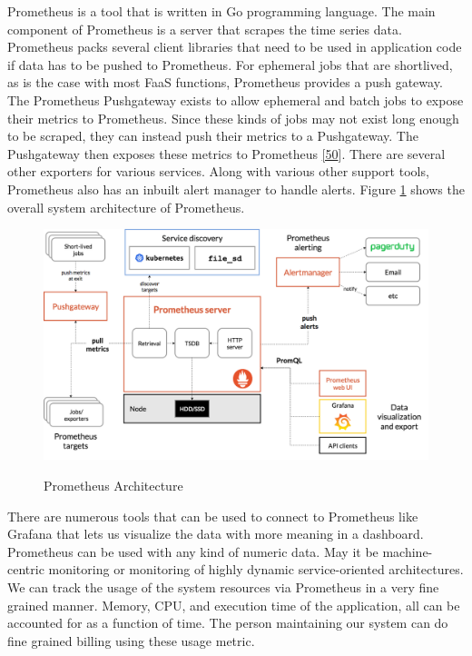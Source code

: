 \documentclass[12pt,titlepage]{article}
\begin{document}
Prometheus is a tool that is written in Go programming language. The main
component of Prometheus is a server that scrapes the time series data.
Prometheus packs several client libraries that need to be used in application
code if data has to be pushed to Prometheus. For ephemeral jobs that are
shortlived, as is the case with most FaaS functions, Prometheus provides a push
gateway. The Prometheus Pushgateway exists to allow ephemeral and batch jobs to expose
their metrics to Prometheus. Since these kinds of jobs may not exist long enough
to be scraped, they can instead push their metrics to a Pushgateway. The
Pushgateway then exposes these metrics to Prometheus \hyperref[ref:50]{[50}]. There are
several other exporters for various services. Along with various other support
tools, Prometheus also has an inbuilt alert manager to handle alerts. Figure \ref{fig:prometheus}
shows the overall system architecture of Prometheus.

\begin{figure}[!h]
    \caption{Prometheus Architecture}
    \centering
    \includegraphics[width=130mm]{./thesis_images/prometheus.png}
    \label{fig:prometheus}
\end{figure}

There are numerous tools that can be used to connect to Prometheus like Grafana
that lets us visualize the data with more meaning in a dashboard. Prometheus can
be used with any kind of numeric data. May it be machine-centric monitoring or
monitoring of highly dynamic service-oriented architectures. We can track the
usage of the system resources via Prometheus in a very fine grained manner.
Memory, CPU, and execution time of the application, all can be accounted for as
a function of time. The person maintaining our system can do fine grained
billing using these usage metric.
\end{document}
